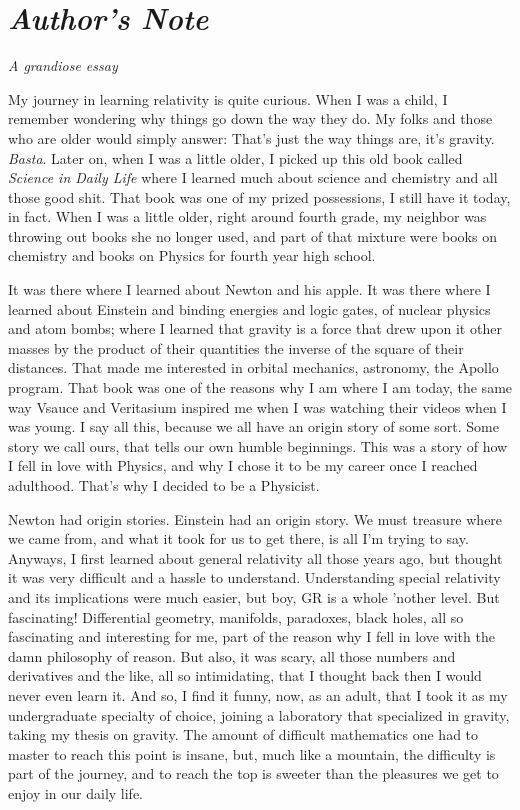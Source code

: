 \section*{ \textit{Author's Note} }
\textit{A grandiose essay}
\vspace{0.5cm}

My journey in learning relativity is quite curious. When I was a child, I remember 
wondering why things go down the way they do.
My folks and those who are older would simply answer: That's just the way things are, it's gravity. \textit{Basta}. 
Later on, when I was a little older, I picked up this old book called \textit{Science in Daily Life} where I learned
much about science and chemistry and all those good shit. That book was one of my prized possessions,
I still have it today, in fact. When I was a little older, right around fourth grade, my neighbor
was throwing out books she no longer used, and part of that mixture were books on chemistry and 
books on Physics for fourth year high school. 

It was there where I learned about Newton and his apple. It was there where I learned about Einstein and
binding energies and logic gates, of nuclear physics and atom bombs; where I learned that gravity is a force that drew upon it other 
masses by the product of their quantities the inverse of the square of their distances. That made me interested in orbital mechanics,
astronomy, the Apollo program. That book was one of the reasons why I am where I am today, the same way
Vsauce and Veritasium inspired me when I was watching their videos when I was young. I say 
all this, because we all have an origin story of some sort. Some story we call ours, that tells 
our own humble beginnings. This was a story of how I fell in love with Physics, and why I chose it
to be my career once I reached adulthood. That's why I decided to be a Physicist.

Newton had origin stories. Einstein had an origin story. We must treasure where we came from, and 
what it took for us to get there, is all I'm trying to say. Anyways, I first learned about general 
relativity all those years ago, but thought it was very difficult and a hassle to understand. Understanding
special relativity and its implications were much easier, but boy, GR is a whole 'nother level. 
But fascinating! Differential geometry, manifolds, paradoxes, black holes, all so fascinating and interesting
for me, part of the reason why I fell in love with the damn philosophy of reason. But also, it was scary,
all those numbers and derivatives and the like, all so intimidating, that I thought back then I 
would never even learn it. And so, I 
find it funny, now, as an adult, that I took it as my undergraduate specialty of choice, joining
a laboratory that specialized in gravity, taking my thesis on gravity. The amount of difficult mathematics
one had to master to reach this point is insane, but, much like a mountain, the difficulty is part
of the journey, and to reach the top is sweeter than the pleasures we get to enjoy in our daily life.

